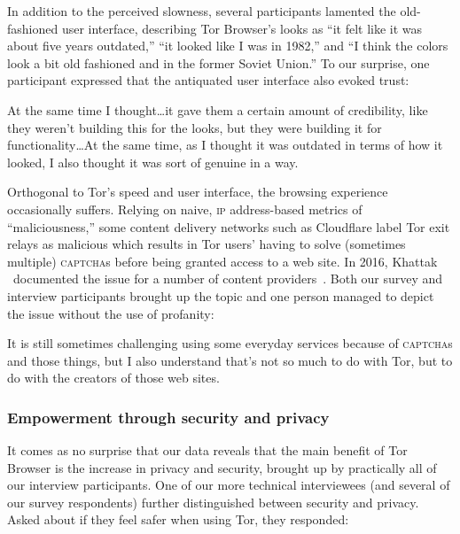 In addition to the perceived slowness, several participants lamented the
old-fashioned user interface, describing Tor Browser's looks as ``it felt like
it was about five years outdated,'' ``it looked like I was in 1982,'' and ``I
think the colors look a bit old fashioned and in the former Soviet Union.'' To
our surprise, one participant expressed that the antiquated user interface also
evoked trust:

\begin{displayquote}[P02]
At the same time I thought\ldots it gave them a certain amount of credibility,
like they weren't building this for the looks, but they were building it for
functionality\ldots  At the same time, as I thought it was outdated in terms of
how it looked, I also thought it was sort of genuine in a way.
\end{displayquote}

Orthogonal to Tor's speed and user interface, the browsing experience
occasionally suffers.  Relying on naive, \textsc{ip} address-based metrics of
``maliciousness,'' some content delivery networks such as Cloudflare label Tor
exit relays as malicious which results in Tor users' having to solve (sometimes
multiple) \textsc{captcha}s before being granted access to a web site.  In 2016,
Khattak \ea\ documented the issue for a number of content
providers~\cite{Khattak2016a}.  Both our survey and interview participants
brought up the topic and one person managed to depict the issue without the use
of profanity:

\begin{displayquote}[P06]
It is still sometimes challenging using some everyday services because of
\textsc{captcha}s and those things, but I also understand that's not so much to
do with Tor, but to do with the creators of those web sites.
\end{displayquote}

\subsubsection{Empowerment through security and privacy}

It comes as no surprise that our data reveals that the main benefit of Tor
Browser is the increase in privacy and security, brought up by practically all
of our interview participants.  One of our more technical interviewees (and
several of our survey respondents) further distinguished between security and
privacy.  Asked about if they feel safer when using Tor, they responded:

